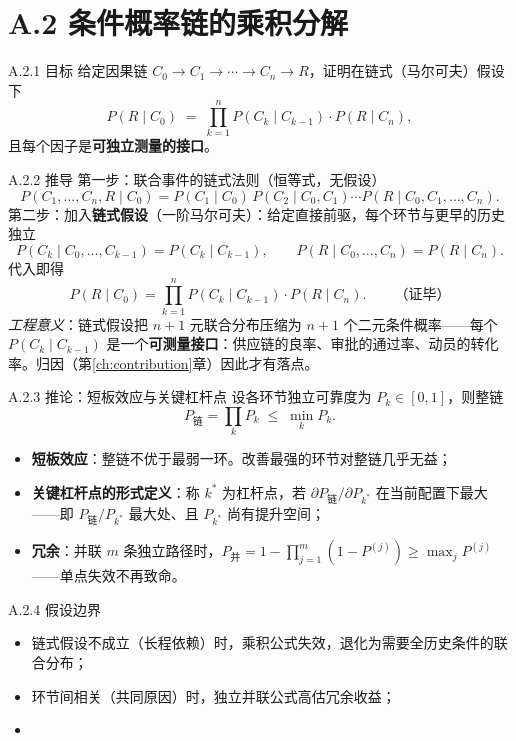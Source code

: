 \documentclass[../../main2.tex]{subfiles}
\begin{document}
	\section{A.2 条件概率链的乘积分解}
	\label{app:chain}


	\begin{mathbox}{A.2.1 目标}
		给定因果链 $C_0 \to C_1 \to \cdots \to C_n \to R$，证明在链式（马尔可夫）假设下
		\[ P(R \mid C_0) \;=\; \prod_{k=1}^{n} P(C_k \mid C_{k-1}) \cdot P(R \mid C_n), \]
		且每个因子是\textbf{可独立测量的接口}。
	\end{mathbox}

	\begin{mathbox}{A.2.2 推导}
		第一步：联合事件的链式法则（恒等式，无假设）
		\[ P(C_1, \dots, C_n, R \mid C_0) = P(C_1 \mid C_0)\, P(C_2 \mid C_0, C_1) \cdots P(R \mid C_0, C_1, \dots, C_n). \]
		第二步：加入\textbf{链式假设}（一阶马尔可夫）：给定直接前驱，每个环节与更早的历史独立
		\[ P(C_k \mid C_0, \dots, C_{k-1}) = P(C_k \mid C_{k-1}), \qquad P(R \mid C_0, \dots, C_n) = P(R \mid C_n). \]
		代入即得
		\[ P(R \mid C_0) = \prod_{k=1}^{n} P(C_k \mid C_{k-1}) \cdot P(R \mid C_n). \qquad \text{（证毕）} \]
		\textit{工程意义}：链式假设把 $n{+}1$ 元联合分布压缩为 $n{+}1$ 个二元条件概率——每个 $P(C_k \mid C_{k-1})$ 是一个\textbf{可测量接口}：供应链的良率、审批的通过率、动员的转化率。归因（第\ref{ch:contribution}章）因此才有落点。
	\end{mathbox}

	\begin{mathbox}{A.2.3 推论：短板效应与关键杠杆点}
		设各环节独立可靠度为 $P_k \in [0,1]$，则整链
		\[ P_{\text{链}} = \prod_{k} P_k \;\le\; \min_k P_k. \]
		\begin{itemize}
			\item \textbf{短板效应}：整链不优于最弱一环。改善最强的环节对整链几乎无益；
			\item \textbf{关键杠杆点的形式定义}：称 $k^\ast$ 为杠杆点，若 $\partial P_{\text{链}} / \partial P_{k^\ast}$ 在当前配置下最大——即 $P_{\text{链}} / P_{k^\ast}$ 最大处、且 $P_{k^\ast}$ 尚有提升空间；
			\item \textbf{冗余}：并联 $m$ 条独立路径时，$P_{\text{并}} = 1 - \prod_{j=1}^{m}(1 - P^{(j)}) \ge \max_j P^{(j)}$——单点失效不再致命。
		\end{itemize}
	\end{mathbox}

	\begin{mathbox}{A.2.4 假设边界}
		\begin{itemize}
			\item 链式假设不成立（长程依赖）时，乘积公式失效，退化为需要全历史条件的联合分布；
			\item 环节间相关（共同原因）时，独立并联公式高估冗余收益；
			\item {}
		\end{itemize}
	\end{mathbox}
\end{document}
